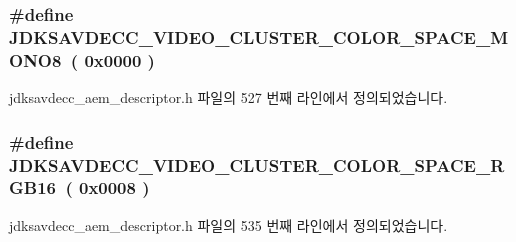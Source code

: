 \subsubsection[{\texorpdfstring{J\+D\+K\+S\+A\+V\+D\+E\+C\+C\+\_\+\+V\+I\+D\+E\+O\+\_\+\+C\+L\+U\+S\+T\+E\+R\+\_\+\+C\+O\+L\+O\+R\+\_\+\+S\+P\+A\+C\+E\+\_\+\+M\+O\+N\+O8}{JDKSAVDECC_VIDEO_CLUSTER_COLOR_SPACE_MONO8}}]{\setlength{\rightskip}{0pt plus 5cm}\#define J\+D\+K\+S\+A\+V\+D\+E\+C\+C\+\_\+\+V\+I\+D\+E\+O\+\_\+\+C\+L\+U\+S\+T\+E\+R\+\_\+\+C\+O\+L\+O\+R\+\_\+\+S\+P\+A\+C\+E\+\_\+\+M\+O\+N\+O8~( 0x0000 )}\hypertarget{group__video__cluster__color__space_ga92427a3fa1b84c83421a5212e02e80c5}{}\label{group__video__cluster__color__space_ga92427a3fa1b84c83421a5212e02e80c5}


jdksavdecc\+\_\+aem\+\_\+descriptor.\+h 파일의 527 번째 라인에서 정의되었습니다.

\subsubsection[{\texorpdfstring{J\+D\+K\+S\+A\+V\+D\+E\+C\+C\+\_\+\+V\+I\+D\+E\+O\+\_\+\+C\+L\+U\+S\+T\+E\+R\+\_\+\+C\+O\+L\+O\+R\+\_\+\+S\+P\+A\+C\+E\+\_\+\+R\+G\+B16}{JDKSAVDECC_VIDEO_CLUSTER_COLOR_SPACE_RGB16}}]{\setlength{\rightskip}{0pt plus 5cm}\#define J\+D\+K\+S\+A\+V\+D\+E\+C\+C\+\_\+\+V\+I\+D\+E\+O\+\_\+\+C\+L\+U\+S\+T\+E\+R\+\_\+\+C\+O\+L\+O\+R\+\_\+\+S\+P\+A\+C\+E\+\_\+\+R\+G\+B16~( 0x0008 )}\hypertarget{group__video__cluster__color__space_gaf33cfa5b359efab9bcc244d360cc4510}{}\label{group__video__cluster__color__space_gaf33cfa5b359efab9bcc244d360cc4510}


jdksavdecc\+\_\+aem\+\_\+descriptor.\+h 파일의 535 번째 라인에서 정의되었습니다.


